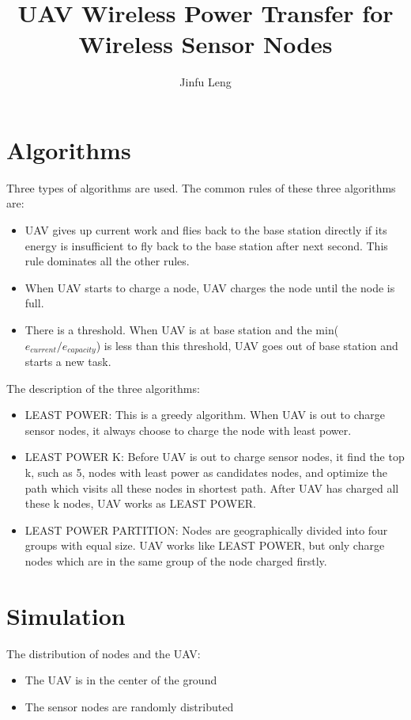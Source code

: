 \documentclass[11pt]{article}
\begin{document}
\title{UAV Wireless Power Transfer for Wireless Sensor Nodes}
\author{Jinfu Leng}
\maketitle
\section{Algorithms}
Three types of algorithms are used. The common rules of these three algorithms are:
\begin{itemize}
\item UAV gives up current work and flies back to the base station directly if its energy is insufficient to fly back to the base station after next second. This rule dominates all the other rules.
\item When UAV starts to charge a node, UAV charges the node until the node is full.
\item There is a threshold. When UAV is at base station and the min($e_{current}/e_{capacity}$) is less than this threshold, UAV goes out of base station and starts a new task.
\end{itemize}
The description of the three algorithms:
\begin{itemize}
\item LEAST POWER: This is a greedy algorithm. When UAV is out to charge sensor nodes, it always choose to charge the node with least power.
\item LEAST POWER K: Before UAV is out to charge sensor nodes, it find the top k, such as 5, nodes with least power as candidates nodes, and optimize the path which visits all these nodes in shortest path. After UAV has charged all these k nodes, UAV works as LEAST POWER.
\item LEAST POWER PARTITION: Nodes are geographically divided into four groups with equal size. UAV works like LEAST POWER, but only charge nodes which are in the same group of the node charged firstly.
\end{itemize}

\section{Simulation}
The distribution of nodes and the UAV:
\begin{itemize}
\item The UAV is in the center of the ground
\item The sensor nodes are randomly distributed
\end{itemize}
\end{document}
